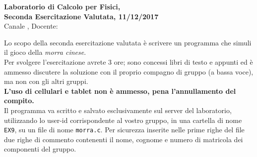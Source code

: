 \documentclass[11pt]{article}
\begin{document}
\pagestyle{empty}

\begin{center}
{\Large \bf  Laboratorio di Calcolo per Fisici,\\ Seconda Esercitazione Valutata, 11/12/2017 \\[2mm]}
{\large Canale \canale, Docente: \docente}
\end{center}
\vspace{4mm}

\begin{mdframed}[backgroundcolor=gray!10]
Lo scopo della seconda esercitazione valutata \`e scrivere un programma che simuli il gioco della {\em morra cinese}. \\
Per svolgere l'esercitazione avrete 3 ore; sono concessi libri di testo e appunti
ed \`e ammesso discutere la soluzione con il proprio compagno di gruppo
(a bassa voce), ma non con gli altri gruppi.
\\
{\bf L'uso di cellulari e tablet non \`e ammesso, pena l'annullamento del compito.}
\\
Il programma va scritto e salvato esclusivamente sul server del laboratorio,
utilizzando lo user-id corrispondente al vostro gruppo, in una cartella
di nome \texttt{EX9}, su un file di nome \texttt{morra.c}. Per sicurezza inserite 
nelle prime righe del file due righe di commento contenenti il nome, cognome
e numero di matricola dei componenti del gruppo.
  \end{mdframed}
%
%
\end{document}
